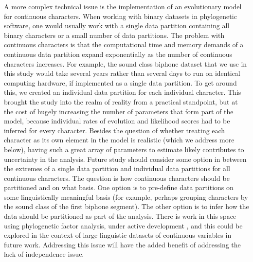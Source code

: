 \documentclass[]{article}
\begin{document}
A more complex technical issue is the implementation of an evolutionary model for continuous characters. When working with binary datasets in phylogenetic software, one would usually work with a single data partition containing all binary characters or a small number of data partitions. The problem with continuous characters is that the computational time and memory demands of a continuous data partition expand exponentially as the number of continuous characters increases. For example, the sound class biphone dataset that we use in this study would take several years rather than several days to run on identical computing hardware, if implemented as a single data partition. To get around this, we created an individual data partition for each individual character. This brought the study into the realm of reality from a practical standpoint, but at the cost of hugely increasing the number of parameters that form part of the model, because individual rates of evolution and likelihood scores had to be inferred for every character. Besides the question of whether treating each character as its own element in the model is realistic (which we address more below), having such a great array of parameters to estimate likely contributes to uncertainty in the analysis. Future study should consider some option in between the extremes of a single data partition and individual data partitions for all continuous characters. The question is how continuous characters should be partitioned and on what basis. One option is to pre-define data partitions on some linguistically meaningful basis (for example, perhaps grouping characters by the sound class of the first biphone segment). The other option is to infer how the data should be partitioned as part of the analysis. There is work in this space using phylogenetic factor analysis, under active development \autocites{tolkoff_phylogenetic_2018}{hassler_inferring_2020}, and this could be explored in the context of large linguistic datasets of continuous variables in future work. Addressing this issue will have the added benefit of addressing the lack of independence issue.
\end{document}
